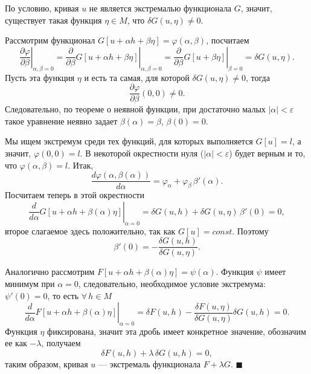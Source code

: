 \documentclass[12pt,a5paper]{book}
\begin{document}
	По условию, кривая $u$ не является экстремалью функционала
	$G$, значит, существует такая функция $\eta \in M$, что $\delta G(u,\eta) \neq 0$.
	
	Рассмотрим функционал $G[u + \alpha h + \beta \eta] = \varphi(\alpha,\beta)$, посчитаем
	\begin{equation*}
		\left.\frac{\partial\varphi}{\partial\beta}\right|_{\alpha, \beta = 0} = \left.\frac{\partial}{\partial\beta}G[u + \alpha h + \beta \eta]\right|_{\alpha, \beta = 0} = \left.\frac{\partial}{\partial\beta}G[u + \beta \eta]\right|_{\beta = 0} = \delta G(u,\eta).
	\end{equation*}
	Пусть эта функция $\eta$ и есть та самая, для которой $\delta G(u,\eta) \neq 0$, тогда
	\begin{equation*}
		\frac{\partial\varphi}{\partial\beta}(0,0) \neq 0.
	\end{equation*}
	Следовательно, по теореме о неявной функции, при достаточно малых $|\alpha| < \varepsilon$ такое уравнение неявно задает $\beta(\alpha) = \beta$, $\beta(0) = 0$.
	
	Мы ищем экстремум среди тех функций, для которых выполняется $G[u] = l$, а значит, $\varphi(0,0) = l$. В некоторой окрестности нуля ($|\alpha| < \varepsilon$) будет верным и то, что $\varphi(\alpha,\beta) = l$. Итак,
	\begin{equation*}
		\frac{d\varphi(\alpha,\beta(\alpha))}{d\alpha} = \varphi_\alpha + \varphi_\beta\,\beta'(\alpha).
	\end{equation*}
	Посчитаем теперь в этой окрестности
	\begin{equation*}
		\left.\frac{d}{d\alpha}G[u + \alpha h + \beta(\alpha)\eta]\right|_{\alpha=0} = \delta G(u,h) + \delta G(u,\eta)\,\beta'(0) = 0,
	\end{equation*}
	второе слагаемое здесь положительно, так как $G[u] = const$. Поэтому
	\begin{equation*}
		\beta'(0) = -\frac{\delta G(u,h)}{\delta G(u,\eta)}.
	\end{equation*}
	
	Аналогично рассмотрим $F[u + \alpha h + \beta(\alpha)\eta] = \psi(\alpha)$. Функция $\psi$ имеет минимум при $\alpha=0$, следовательно, необходимое условие экстремума: $\psi'(0) = 0$, то есть $\forall\,h \in M$
	\begin{equation*}
		\left.\frac{d}{d\alpha}F[u + \alpha h + \beta(\alpha)\eta]\right|_{\alpha=0} = \delta F(u,h) - \frac{\delta F(u,\eta)}{\delta G(u,\eta)}\delta G(u,h) = 0.
	\end{equation*}
	Функция $\eta$ фиксирована, значит эта дробь имеет конкретное значение, обозначим ее как $-\lambda$, получаем
	\begin{equation*}
		\delta F(u,h) + \lambda\,\delta G(u,h) = 0,
	\end{equation*}
	таким образом, кривая $u$ --- экстремаль функционала $F + \lambda G$. $\blacksquare$
	
\end{document}
